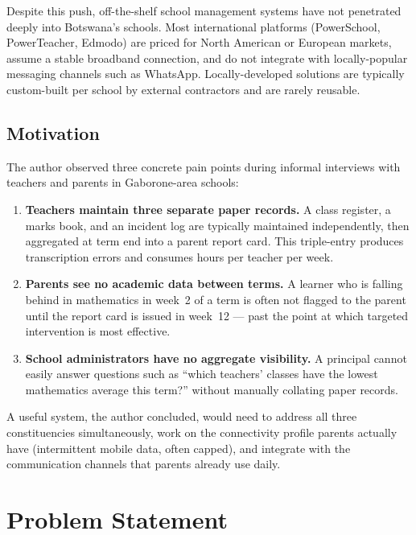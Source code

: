 \documentclass[11pt,a4paper]{article}
\begin{document}
Despite this push, off-the-shelf school management systems have not penetrated
deeply into Botswana's schools. Most international platforms (PowerSchool,
PowerTeacher, Edmodo) are priced for North American or European markets, assume
a stable broadband connection, and do not integrate with locally-popular
messaging channels such as WhatsApp. Locally-developed solutions are typically
custom-built per school by external contractors and are rarely reusable.

\subsection{Motivation}

The author observed three concrete pain points during informal interviews with
teachers and parents in Gaborone-area schools:

\begin{enumerate}[leftmargin=*]
    \item \textbf{Teachers maintain three separate paper records.} A class
    register, a marks book, and an incident log are typically maintained
    independently, then aggregated at term end into a parent report card. This
    triple-entry produces transcription errors and consumes hours per teacher
    per week.

    \item \textbf{Parents see no academic data between terms.} A learner who is
    falling behind in mathematics in week~2 of a term is often not flagged to
    the parent until the report card is issued in week~12 --- past the point at
    which targeted intervention is most effective.

    \item \textbf{School administrators have no aggregate visibility.} A
    principal cannot easily answer questions such as ``which teachers' classes
    have the lowest mathematics average this term?'' without manually collating
    paper records.
\end{enumerate}

A useful system, the author concluded, would need to address all three
constituencies simultaneously, work on the connectivity profile parents actually
have (intermittent mobile data, often capped), and integrate with the
communication channels that parents already use daily.

\section{Problem Statement}
\end{document}
